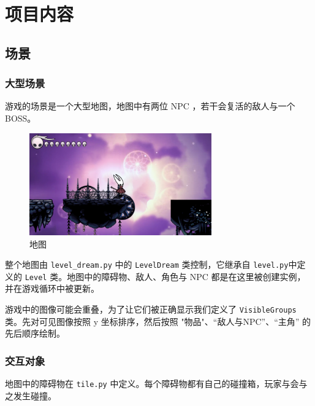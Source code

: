 \documentclass[12pt, twoside, a4paper]{article}
\newcommand{\inlinecode}[1]{\setlength{\fboxsep}{0.8mm} \colorbox{lightgray!40}{\texttt{#1}}}
\begin{document}
\section{项目内容}

\subsection{场景}

\subsubsection{大型场景}

游戏的场景是一个大型地图，地图中有两位 NPC ，若干会复活的敌人与一个 BOSS。

\begin{figure}[h!]
    \centering
    \includegraphics[width=0.7\textwidth]{assets/report/world.png}
    \caption{地图}
\end{figure}

整个地图由 \inlinecode{level\_dream.py} 中的 \inlinecode{LevelDream} 类控制，它继承自 \inlinecode{level.py}中定义的 \inlinecode{Level} 类。地图中的障碍物、敌人、角色与 NPC 都是在这里被创建实例，并在游戏循环中被更新。

游戏中的图像可能会重叠，为了让它们被正确显示我们定义了 \inlinecode{VisibleGroups} 类。先对可见图像按照 y 坐标排序，然后按照 "物品"、“敌人与NPC”、“主角” 的先后顺序绘制。

\subsubsection{交互对象}

地图中的障碍物在 \inlinecode{tile.py} 中定义。每个障碍物都有自己的碰撞箱，玩家与会与之发生碰撞。
\end{document}
